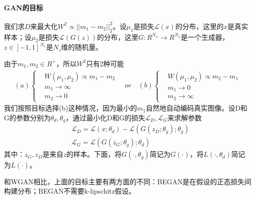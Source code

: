             \paragraph{GAN的目标}我们求$D$来最大化$W^2 \propto ||m_1-m_2||_2^2$。设$\mu_1$是损失$\mathcal{L}(x)$的分布，这里的$x$是真实样本；设$\mu_2$是损失$\mathcal{L}(G(z))$的分布，这里$G:R^{N_x}\to R^{N_x}$是一个生成器，$z\in [-1,1]^{N_z}$是$N_z$维的随机量。
            \par
            由于$m_1,m_2\in R^+$，所以$W^2$只有2种可能
            \begin{align*}
            (a)\left\{
            \begin{aligned}
            &W(\mu_1,\mu_2) \propto m_1-m_2\\
            &m_1\to \infty\\
            &m_2\to 0
            \end{aligned}
            \right.
            \quad
            or
            \quad
            (b)\left\{
            \begin{aligned}
            &W(\mu_1,\mu_2) \propto m_2-m_1\\
            &m_1\to 0\\
            &m_2\to \infty
            \end{aligned}
            \right.
            \end{align*}
            我们按照目标选择(b)这种情况，因为最小的$m_1$自然地自动编码真实图像。设D和G的参数分别为$\theta_d,\theta_g$，通过最小化D和G的损失$\mathcal{L}_D,\mathcal{L}_G$来求解参数
            \begin{align*}
            & \mathcal{L}_D = \mathcal{L}(x;\theta_d) - \mathcal{L}(G(z_D;\theta_g);\theta_g)\\
            & \mathcal{L}_G = \mathcal{L}(G(z_G;\theta_g);\theta_d)
            \end{align*}
            其中：$z_G,z_D$是来自$z$的样本。下面，将$G(\cdot,\theta_g)$简记为$G(\cdot)$，将$L(\cdot,\theta_d)$简记为$L(\cdot)$。
            \par
            和WGAN相比，上面的目标主要有两方面的不同：BEGAN是在假设的正态损失间构建分布；BEGAN不需要k-lipschitz假设。
